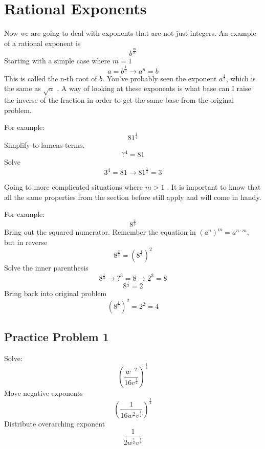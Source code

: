 \documentclass[12pt, letterpaper, oneside]{book}
\begin{document}
\section{Rational Exponents}
Now we are going to deal with exponents that are not just integers. An example of a rational exponent is
\[b^{\frac{m}{n}}\]
Starting with a simple case where $m = 1$
\[a = b^{\frac{1}{n}} \rightarrow a^n = b\]
This is called the n-th root of $b$. You've probably seen the exponent $a^{\frac{1}{2}}$, which is the same as $\sqrt{a}$ . A way of looking at these exponents is what base can I raise the inverse of the fraction in order to get the same base from the original problem.

For example:
\[81^{\frac{1}{4}}\]
Simplify to lamens terms.
\[?^{4} = 81\]
Solve
\[3^4 = 81 \rightarrow 81^{\frac{1}{4}} = 3\]

Going to more complicated situations where $m > 1$ .
It is important to know that all the same properties from the section before still apply and will come in handy.

For example:
\[8^{\frac{2}{3}}\]
Bring out the squared numerator. Remember the equation in $(a^n)^m = a^{n \cdot m}$, but in reverse
\[ 8^{\frac{2}{3}} = \left( 8^{\frac{1}{3}} \right)^2 \]
Solve the inner parenthesis
\[ 8^{\frac{1}{3}} \rightarrow ?^3 = 8 \rightarrow 2^3 = 8\]
\[ 8^{\frac{1}{3}} = 2\]
Bring back into original problem
\[\left( 8^{\frac{1}{3}} \right)^2 = 2^2 = 4\]

\subsection{Practice Problem 1}
Solve:
\[\left( \frac{w^{-2}}{16v^{\frac{1}{2}}} \right) ^ {\frac{1}{4}}\]
Move negative exponents
\[\left( \frac{1}{16w^{2}v^{\frac{1}{2}}} \right) ^ {\frac{1}{4}}\]
Distribute overarching exponent
\[\frac{1}{2w^{\frac{1}{2}}v^{\frac{1}{8}}}\]
\end{document}

